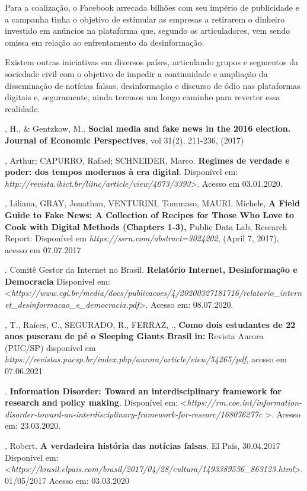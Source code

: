 Para a coalização, o Facebook arrecada bilhões com seu império de
publicidade e a campanha tinha o objetivo de estimular as empresas a
retirarem o dinheiro investido em anúncios na plataforma que, segundo os
articuladores, vem sendo omissa em relação ao enfrentamento da
desinformação.

Existem outras iniciativas em diversos países, articulando grupos e
segmentos da sociedade civil com o objetivo de impedir a continuidade e
ampliação da disseminação de notícias falsas, desinformação e discurso
de ódio nas plataformas digitais e, seguramente, ainda teremos um longo
caminho para reverter essa realidade.


\begin{bibliohedra}
, H., \& Gentzkow, M.. \textbf{Social media and fake news in the
2016 election. Journal of Economic Perspectives}, vol 31(2), 211-236,
(2017)

, Arthur; CAPURRO, Rafael; SCHNEIDER, Marco. \textbf{Regimes de
verdade e poder: dos tempos modernos à era digital}. Disponível em:
\emph{http://revista.ibict.br/liinc/article/view/4073/3393}\textgreater{}.
Acesso em 03.01.2020.

, Liliana, GRAY, Jonathan, VENTURINI, Tommaso, MAURI, Michele,
\textbf{A Field Guide to Fake News: A Collection of Recipes for Those
Who Love to Cook with Digital Methods (Chapters 1-3),} Public Data Lab,
Research Report: Disponível em
\emph{https://ssrn.com/abstract=3024202},
(April 7, 2017), acesso em 07.07.2017

. Comitê Gestor da Internet no Brasil. \textbf{Relatório Internet,
Desinformação e Democracia} Disponível em:
\textless{}\emph{https://www.cgi.br/media/docs/publicacoes/4/20200327181716/relatorio\_internet\_desinformacao\_e\_democracia.pdf}\textgreater{}.
Acesso em: 08.07.2020.

, T., Raíces, C., SEGURADO, R., FERRAZ, ., \textbf{Como dois
estudantes de 22 anos puseram de pé o Sleeping Giants Brasil in:}
Revista Aurora (PUC/SP) disponível em \emph{https://revistas.pucsp.br/index.php/aurora/article/view/54265/pdf},
acesso em 07.06.2021

. \textbf{Information Disorder: Toward an
interdisciplinary framework for research and policy making}. Disponível
em:
\textless{}\emph{https://rm.coe.int/information-disorder-toward-an-interdisciplinary-framework-for-researc/168076277c}
\textgreater{}. Acesso em: 23.03.2020.

, Robert. \textbf{A verdadeira história das notícias falsas}. El
País, 30.04.2017 Disponível em:
\textless{}\emph{https://brasil.elpais.com/brasil/2017/04/28/cultura/1493389536\_863123.html}\textgreater{}.
01/05/2017 Acesso em: 03.03.2020


\end{bibliohedra}
